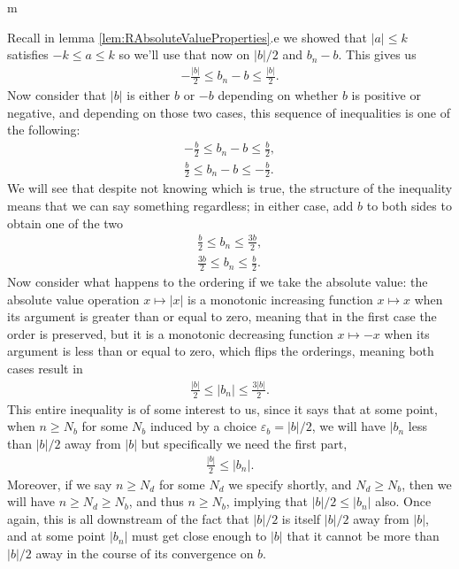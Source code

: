 \documentclass[11pt]{article}
\begin{document}
\begin{my proof}{m}
\begin{enumerate}
Recall in lemma \ref{lem:RAbsoluteValueProperties}.e we showed that $|a| \le k$ satisfies $-k \le a \le k$ so we'll use that now on $|b|/2$ and $b_n - b$. This gives us \begin{gather*}
-\frac{|b|}{2} \le b_n - b \le \frac{|b|}{2}.
\end{gather*}
Now consider that $|b|$ is either $b$ or $-b$ depending on whether $b$ is positive or negative, and depending on those two cases, this sequence of inequalities is one of the following: \begin{gather*}
-\frac{b}{2} \le b_n - b \le \frac{b}{2}, \\
\frac{b}{2} \le b_n - b \le -\frac{b}{2}.
\end{gather*}
We will see that despite not knowing which is true, the structure of the inequality means that we can say something regardless; in either case, add $b$ to both sides to obtain one of the two \begin{gather*}
\frac{b}{2} \le b_n \le \frac{3b}{2}, \\
\frac{3b}{2} \le b_n \le \frac{b}{2}.
\end{gather*}
Now consider what happens to the ordering if we take the absolute value: the absolute value operation $x \mapsto |x|$ is a monotonic increasing function $x \mapsto x$ when its argument is greater than or equal to zero, meaning that in the first case the order is preserved, but it is a monotonic decreasing function $x \mapsto -x$ when its argument is less than or equal to zero, which flips the orderings, meaning both cases result in \begin{gather*}
\frac{|b|}{2} \le |b_n| \le \frac{3|b|}{2}.
\end{gather*}
This entire inequality is of some interest to us, since it says that at some point, when $n \ge N_b$ for some $N_b$ induced by a choice $\varepsilon_b = |b|/2$, we will have $|b_n$ less than $|b|/2$ away from $|b|$ but specifically we need the first part, \begin{gather*}
\frac{|b|}{2} \le |b_n|.
\end{gather*}
Moreover, if we say $n \ge N_d$ for some $N_d$ we specify shortly, and $N_d \ge N_b$, then we will have $n \ge N_d \ge N_b$, and thus $n \ge N_b$, implying that $|b|/2 \le |b_n|$ also. Once again, this is all downstream of the fact that $|b|/2$ is itself $|b|/2$ away from $|b|$, and at some point $|b_n|$ must get close enough to $|b|$ that it cannot be more than $|b|/2$ away in the course of its convergence on $b$.


\end{enumerate}
\end{my proof}
\end{document}
